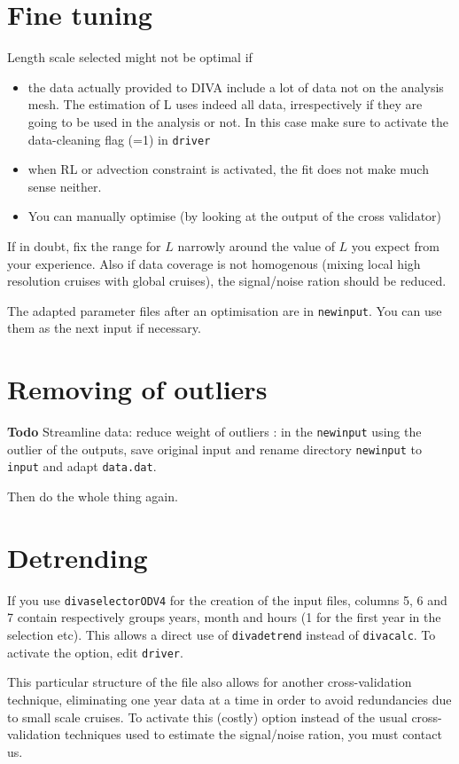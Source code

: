 \documentclass[8pt,a4paper,notitlepage]{book}
\newcommand{\diva}{DIVA}
\begin{document}
\section{Fine tuning}
Length scale selected might not be optimal if
\begin{itemize}
\item the data actually provided to {\diva} include a lot of data not on the analysis mesh. The estimation of L uses indeed all data, irrespectively if they are going to be used in the analysis or not. In this case make sure to activate the data-cleaning flag (=1) in {\tt driver}
\item when RL or advection constraint is activated, the fit does not make much sense neither.
\item You can manually optimise (by looking at the output of the cross validator)
\end{itemize}
If in doubt, fix the range for $L$ narrowly around the value of $L$ you expect from your experience. Also if data coverage is not homogenous (mixing 
local high resolution cruises with global cruises), the signal/noise ration should be reduced.



The adapted parameter files after an optimisation are in {\tt newinput}. You can use them as the next input if necessary. 

\section{Removing of outliers}
{\bf Todo} Streamline data: reduce weight of outliers : in the {\tt newinput} using the outlier of the outputs, 
save original input and rename directory {\tt newinput} to {\tt input} and adapt {\tt data.dat}.

Then do the whole thing again.

\section{Detrending}
If you use {\tt divaselectorODV4} for the creation of the input files, columns 5, 6 and 7 contain respectively groups years, month and hours (1 for the first year in the selection etc). This allows a direct use of {\tt divadetrend} instead of {\tt divacalc}. To activate the option, edit {\tt driver}.

This particular structure of the file also allows for another cross-validation technique, eliminating one year data at a time in order to avoid redundancies due to small scale cruises. To activate this (costly) option instead of the usual cross-validation techniques used to estimate the signal/noise ration, you must contact us.
\end{document}
